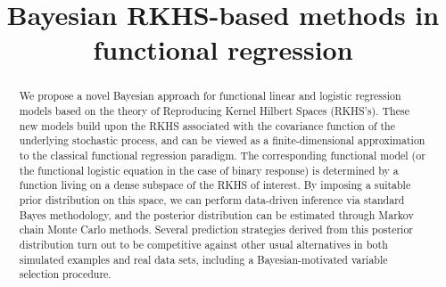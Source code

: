 \documentclass[ba]{imsart}
\numberwithin{equation}{section}
\theoremstyle{plain}
\begin{document}
\begin{frontmatter}
\title{Bayesian RKHS-based methods in functional regression}


\begin{abstract}
We propose a novel Bayesian approach for functional linear and logistic regression models based on the theory of Reproducing Kernel Hilbert Spaces (RKHS's). These new models build upon the RKHS associated with the covariance function of the underlying stochastic process, and can be viewed as a finite-dimensional approximation to the classical functional regression paradigm. The corresponding functional model (or the functional logistic equation in the case of binary response) is determined by a function living on a dense subspace of the RKHS of interest. By imposing a suitable prior distribution on this space, we can perform data-driven inference via standard Bayes methodology, and the posterior distribution can be estimated through Markov chain Monte Carlo methods. Several prediction strategies derived from this posterior distribution turn out to be competitive against other usual alternatives in both simulated examples and real data sets, including a Bayesian-motivated variable selection procedure.
\end{abstract}

\begin{keyword}[class=MSC]
\end{keyword}

\begin{keyword}
\end{keyword}

\end{frontmatter}
\end{document}
